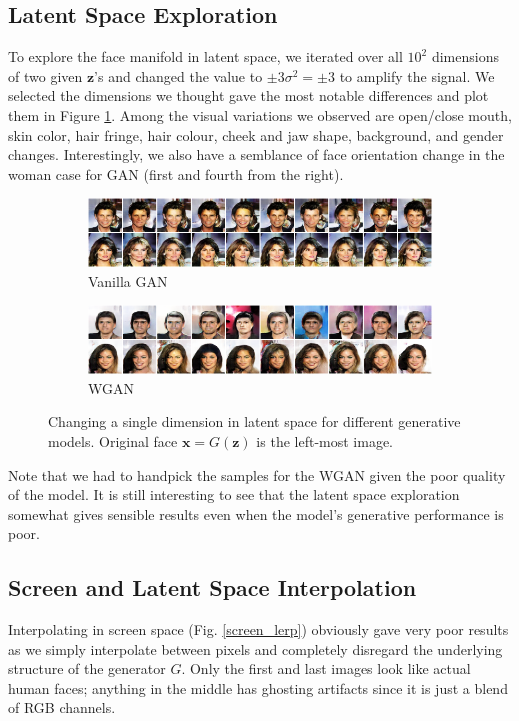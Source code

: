 \documentclass[table]{article}
\def\*#1{\mathbf{#1}}
\begin{document}
\subsection{Latent Space Exploration}
To explore the face manifold in latent space, we iterated over all $10^2$ dimensions of two given $\*z$'s and changed the value to $\pm 3\sigma^2 = \pm 3$ to amplify the signal. We selected the dimensions we thought gave the most notable differences and plot them in Figure \ref{latent_explore}. Among the visual variations we observed are open/close mouth, skin color, hair fringe, hair colour, cheek and jaw shape, background, and gender changes. Interestingly, we also have a semblance of face orientation change in the woman case for GAN (first and fourth from the right).
\begin{figure}[ht]
  \centering
  \begin{subfigure}{\textwidth}
    \centering
    \includegraphics[scale=0.5]{imgs/gan_latent_play}
    \caption{Vanilla GAN}
  \end{subfigure}

  \vspace*{3mm}
  \begin{subfigure}{\textwidth}
    \centering
    \includegraphics[scale=0.5]{imgs/wgan_latent_play}
    \caption{WGAN}
  \end{subfigure}
  \caption{Changing a single dimension in latent space for different generative models. Original face $\*x = G(\*z)$ is the left-most image.}
  \label{latent_explore}
\end{figure}

Note that we had to handpick the samples for the WGAN given the poor quality of the model. It is still interesting to see that the latent space exploration somewhat gives sensible results even when the model's generative performance is poor.

\subsection{Screen and Latent Space Interpolation}
Interpolating in screen space (Fig. \ref{screen_lerp}) obviously gave very poor results as we simply interpolate between pixels and completely disregard the underlying structure of the generator $G$. Only the first and last images look like actual human faces; anything in the middle has ghosting artifacts since it is just a blend of RGB channels.
\end{document}

